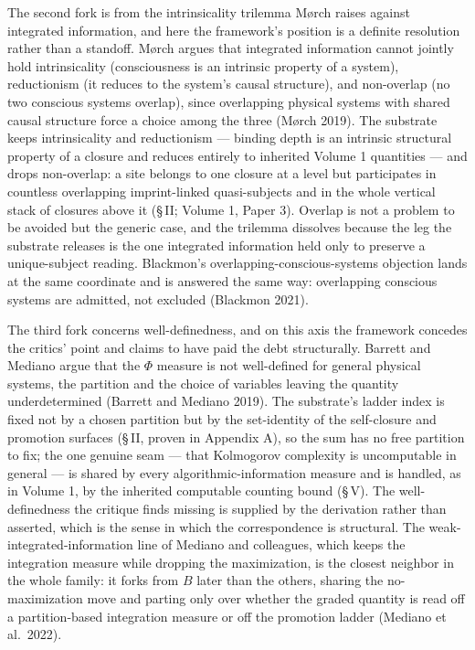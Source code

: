 \documentclass[11pt,oneside]{report}
\theoremstyle{definition}
\theoremstyle{remark}
\begin{document}
The second fork is from the intrinsicality trilemma Mørch raises against integrated information, and here the framework's position is a definite resolution rather than a standoff. Mørch argues that integrated information cannot jointly hold intrinsicality (consciousness is an intrinsic property of a system), reductionism (it reduces to the system's causal structure), and non-overlap (no two conscious systems overlap), since overlapping physical systems with shared causal structure force a choice among the three (Mørch 2019). The substrate keeps intrinsicality and reductionism --- binding depth is an intrinsic structural property of a closure and reduces entirely to inherited Volume 1 quantities --- and drops non-overlap: a site belongs to one closure at a level but participates in countless overlapping imprint-linked quasi-subjects and in the whole vertical stack of closures above it (\S\,II; Volume 1, Paper 3). Overlap is not a problem to be avoided but the generic case, and the trilemma dissolves because the leg the substrate releases is the one integrated information held only to preserve a unique-subject reading. Blackmon's overlapping-conscious-systems objection lands at the same coordinate and is answered the same way: overlapping conscious systems are admitted, not excluded (Blackmon 2021).

The third fork concerns well-definedness, and on this axis the framework concedes the critics' point and claims to have paid the debt structurally. Barrett and Mediano argue that the $\Phi$ measure is not well-defined for general physical systems, the partition and the choice of variables leaving the quantity underdetermined (Barrett and Mediano 2019). The substrate's ladder index is fixed not by a chosen partition but by the set-identity of the self-closure and promotion surfaces (\S\,II, proven in Appendix A), so the sum has no free partition to fix; the one genuine seam --- that Kolmogorov complexity is uncomputable in general --- is shared by every algorithmic-information measure and is handled, as in Volume 1, by the inherited computable counting bound (\S\,V). The well-definedness the critique finds missing is supplied by the derivation rather than asserted, which is the sense in which the correspondence is structural. The weak-integrated-information line of Mediano and colleagues, which keeps the integration measure while dropping the maximization, is the closest neighbor in the whole family: it forks from $B$ later than the others, sharing the no-maximization move and parting only over whether the graded quantity is read off a partition-based integration measure or off the promotion ladder (Mediano et al.\ 2022).
\end{document}
